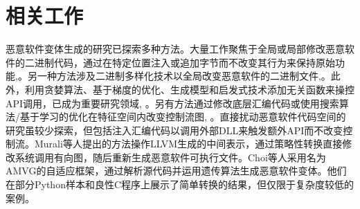 \chapter{相关工作}

恶意软件变体生成的研究已探索多种方法。大量工作聚焦于全局或局部修改恶意软件的二进制代码，通过在特定位置注入或追加字节而不改变其行为来保持原始功能\parencite{Qiao2022},\parencite{Ebrahimi2020,Kreuk2018,Yuan2020,Kolosnjaji2018,Suciu2019}。另一种方法涉及二进制多样化技术以全局改变恶意软件的二进制文件\parencite{Lucas2021},\parencite{Lucas2023}。此外，利用贪婪算法、基于梯度的优化、生成模型和启发式技术添加无关函数来操控API调用，已成为重要研究领域\parencite{Digregorio2024}, \parencite{Hu2017,Kawai2019,Verwer2020}。另有方法通过修改底层汇编代码或使用搜索算法/基于学习的优化在特征空间内改变控制流图\parencite{Ling2024}, \parencite{Zhang2022}。直接扰动恶意软件代码空间的研究虽较少探索，但包括注入汇编代码以调用外部DLL来触发额外API而不改变控制流\parencite{Lu2022}。Murali等人\parencite{Ming2017}提出的方法操作LLVM生成的中间表示，通过策略性转换直接修改系统调用有向图，随后重新生成恶意软件可执行文件。Choi等人\parencite{Choi2019}采用名为AMVG的自适应框架，通过解析源代码并运用遗传算法生成恶意软件变体。他们在部分Python样本和良性C程序上展示了简单转换的结果，但仅限于复杂度较低的案例。